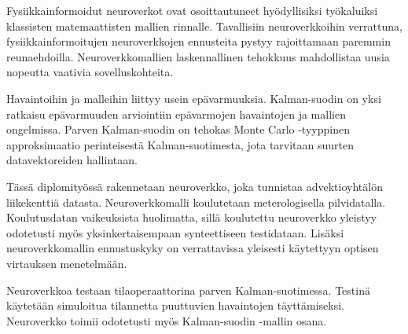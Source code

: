 \documentclass[UKenglish, 12pt, a4paper, sci, utf8, a-1b, online]{aaltothesis}
\numberwithin{equation}{section}
\numberwithin{figure}{section}
\numberwithin{theorem}{section}
\numberwithin{definition}{section}
\numberwithin{lemma}{section}
\begin{document}
\newpage
\begin{abstractpage}[finnish]
    Fysiikkainformoidut neuroverkot ovat osoittautuneet hyödyllisiksi työkaluiksi klassisten matemaattisten mallien rinnalle.
    Tavallisiin neuroverkkoihin verrattuna, fysiikkainformoitujen neuroverkkojen ennusteita pystyy rajoittamaan paremmin reunaehdoilla.
    Neuroverkkomallien laskennallinen tehokkuus mahdollistaa uusia nopeutta vaativia sovelluskohteita.  

    Havaintoihin ja malleihin liittyy usein epävarmuuksia.
    Kalman-suodin on yksi ratkaisu epävarmuuden arviointiin epävarmojen havaintojen ja mallien ongelmissa.
    Parven Kalman-suodin on tehokas Monte Carlo -tyyppinen approksimaatio perinteisestä Kalman-suotimesta, jota tarvitaan suurten datavektoreiden hallintaan.

    Tässä diplomityössä rakennetaan neuroverkko, joka tunnistaa advektioyhtälön liikekenttiä datasta.
    Neuroverkkomalli koulutetaan meterologisella pilvidatalla.
    Koulutusdatan vaikeuksista huolimatta, sillä koulutettu neuroverkko yleistyy odotetusti myös yksinkertaisempaan synteettiseen testidataan.
    Lisäksi neuroverkkomallin ennustuskyky on verrattavissa yleisesti käytettyyn optisen virtauksen menetelmään.

    Neuroverkkoa testaan tilaoperaattorina parven Kalman-suotimessa.
    Testinä käytetään simuloitua tilannetta puuttuvien havaintojen täyttämiseksi.
    Neuroverkko toimii odotetusti myös Kalman-suodin -mallin osana.
\end{abstractpage}
\newpage
\end{document}

